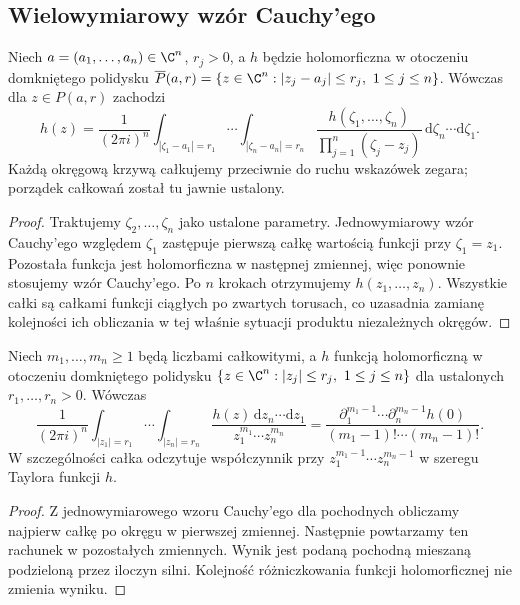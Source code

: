 \subsection{Wielowymiarowy wzór Cauchy'ego}
\label{subsec:ga4-cauchy-product}

\begin{twierdzenie}
\label{tw:ga4-polydisc-cauchy}
Niech $a=(a_1,\ldots,a_n)\in\C^n$, $r_j>0$, a $h$ będzie
holomorficzna w otoczeniu domkniętego polidysku
$\overline P(a,r)=\{z\in\C^n:|z_j-a_j|\le r_j,\ 1\le j\le n\}$.
Wówczas dla $z\in P(a,r)$ zachodzi
\[
 h(z)=\frac{1}{(2\pi i)^n}
 \int_{|\zeta_1-a_1|=r_1}\!\cdots
 \int_{|\zeta_n-a_n|=r_n}
 \frac{h(\zeta_1,\ldots,\zeta_n)}
 {\prod_{j=1}^n(\zeta_j-z_j)}
 \,\mathrm d\zeta_n\cdots\mathrm d\zeta_1.
\]
Każdą okręgową krzywą całkujemy przeciwnie do ruchu wskazówek
zegara; porządek całkowań został tu jawnie ustalony.
\end{twierdzenie}
\begin{proof}
Traktujemy $\zeta_2,\ldots,\zeta_n$ jako ustalone parametry.
Jednowymiarowy wzór Cauchy'ego względem $\zeta_1$ zastępuje
pierwszą całkę wartością funkcji przy $\zeta_1=z_1$.
Pozostała funkcja jest holomorficzna w następnej zmiennej,
więc ponownie stosujemy wzór Cauchy'ego. Po $n$ krokach
otrzymujemy $h(z_1,\ldots,z_n)$.
Wszystkie całki są całkami funkcji ciągłych po zwartych torusach,
co uzasadnia zamianę kolejności ich obliczania w tej właśnie
sytuacji produktu niezależnych okręgów.
\end{proof}

\begin{wniosek}
\label{wn:ga4-monomial-res}
Niech $m_1,\ldots,m_n\ge1$ będą liczbami całkowitymi,
a $h$ funkcją holomorficzną w otoczeniu domkniętego
polidysku $\{z\in\C^n:|z_j|\le r_j,\ 1\le j\le n\}$
dla ustalonych $r_1,\ldots,r_n>0$. Wówczas
\[
\frac{1}{(2\pi i)^n}\int_{|z_1|=r_1}\!\cdots
\int_{|z_n|=r_n}
\frac{h(z)\,\mathrm dz_n\cdots\mathrm dz_1}
{z_1^{m_1}\cdots z_n^{m_n}}
=\frac{\partial_1^{m_1-1}\cdots\partial_n^{m_n-1}h(0)}
{(m_1-1)!\cdots(m_n-1)!}.
\]
W szczególności całka odczytuje współczynnik przy
$z_1^{m_1-1}\cdots z_n^{m_n-1}$ w szeregu Taylora funkcji $h$.
\end{wniosek}
\begin{proof}
Z jednowymiarowego wzoru Cauchy'ego dla pochodnych
obliczamy najpierw całkę po okręgu w pierwszej zmiennej.
Następnie powtarzamy ten rachunek w pozostałych zmiennych.
Wynik jest podaną pochodną mieszaną podzieloną przez
iloczyn silni. Kolejność różniczkowania funkcji
holomorficznej nie zmienia wyniku.
\end{proof}

